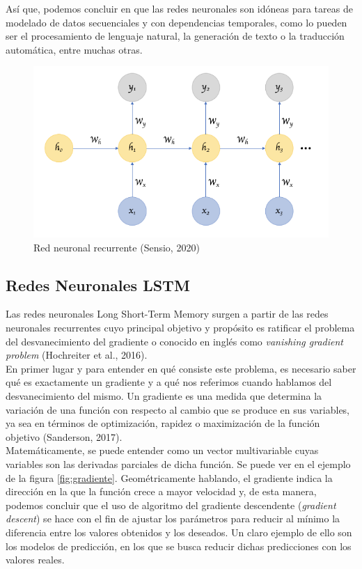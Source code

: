 Así que, podemos concluir en que las redes neuronales son idóneas para tareas de modelado de datos secuenciales y con dependencias temporales, como lo pueden ser el procesamiento de lenguaje natural, la generación de texto o la traducción automática, entre muchas otras.
\begin{figure}[h]
	\centering
	\includegraphics[width = 1 \textwidth]{Imagenes/Vectorial/recurrente.png}
	\caption{Red neuronal recurrente (Sensio, 2020)}
	\label{fig:rnn}
\end{figure}


\subsection{Redes Neuronales LSTM} 

Las redes neuronales Long Short-Term Memory surgen a partir de las redes neuronales recurrentes cuyo principal objetivo y propósito es ratificar el problema del desvanecimiento del gradiente o conocido en inglés como \textit{vanishing gradient problem} (Hochreiter et al., 2016). \\

En primer lugar y para entender en qué consiste este problema, es necesario saber qué es exactamente un gradiente y a qué nos referimos cuando hablamos del desvanecimiento del mismo. Un gradiente es una medida que determina la variación de una función con respecto al cambio que se produce en sus variables, ya sea en términos de optimización, rapidez o maximización de la función objetivo (Sanderson, 2017). \\

Matemáticamente, se puede entender como un vector multivariable cuyas variables son las derivadas parciales de dicha función. Se puede ver en el ejemplo de la figura \ref{fig:gradiente}. Geométricamente hablando, el gradiente indica la dirección en la que la función crece a mayor velocidad y, de esta manera, podemos concluir que el uso de algoritmo del  gradiente descendente (\textit{gradient descent}) se hace con el fin de ajustar los parámetros para reducir al mínimo la diferencia entre los valores obtenidos y los deseados. Un claro ejemplo de ello son los modelos de predicción, en los que se busca reducir dichas predicciones con los valores reales. \\

